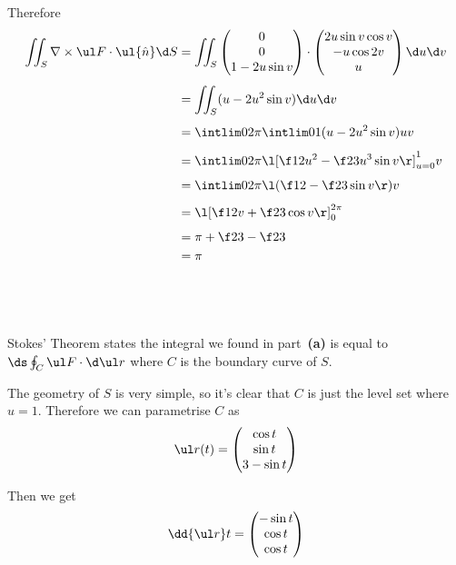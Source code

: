 \documentclass[a4paper]{article}
\begin{document}
Therefore \begin{align*}
\iint_S \nabla \times \ul F \cdot \ul{\hat n} \d S &= \iint_S \begin{pmatrix} 0 \\ 0 \\ 1 - 2u \sin v \end{pmatrix} \cdot \begin{pmatrix} 2u \sin v \cos v \\ -u \cos 2v \\ u \end{pmatrix} \d u \d v\\[1ex]
&= \iint_S (u - 2 u^2 \sin v) \d u \d v\\[1ex]
&= \intlim 0{2\pi} {\intlim 01 {(u - 2 u^2 \sin v)} u} v\\[1ex]
&= \intlim 0{2\pi} {\l[ \f12 u^2 - \f23 u^3 \sin v \r]_{u=0}^1} v\\[1ex]
&= \intlim 0{2\pi} {\l( \f12 - \f23 \sin v \r)} v\\[1ex]
&= \l[ \f12 v + \f23 \cos v \r]_0^{2\pi}\\[1ex]
&= \pi + \f23 - \f23\\
&= \pi
\end{align*}

\subsection{~}

Stokes' Theorem states the integral we found in part~\textbf{(a)} is equal to $\ds \oint_C \ul F \cdot \d \ul r$ where $C$ is the boundary curve of $S$.

The geometry of $S$ is very simple, so it's clear that $C$ is just the level set where $u=1$. Therefore we can parametrise $C$ as $$\ul r(t) = \begin{pmatrix} \cos t \\ \sin t \\ 3 - \sin t \end{pmatrix}$$

Then we get $$\dd {\ul r}t = \begin{pmatrix} -\sin t \\ \cos t \\ \cos t \end{pmatrix}$$
\end{document}
